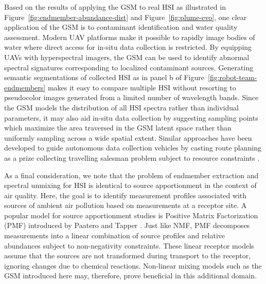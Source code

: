 Based on the results of applying the GSM to real HSI as illustrated in
Figure~\ref{fig:endmember-abundance-dist} and Figure~\ref{fig:plume-evo}, one
clear application of the GSM is to contaminant identification and water quality
assessment. Modern UAV platforms make it possible to rapidly image bodies of
water where direct access for in-situ data collection is restricted. By
equipping UAVs with hyperspectral imagers, the GSM can be used to identify
abnormal spectral signatures corresponding to localized contaminant sources.
Generating semantic segmentations of collected HSI as in panel b of
Figure~\ref{fig:robot-team-endmembers} makes it easy to compare multiple HSI
without resorting to pseudocolor images generated from a limited number of
wavelength bands. Since the GSM models the distribution of all HSI spectra
rather than individual parameters, it may also aid in-situ data collection by
suggesting sampling points which maximize the area traversed in the GSM latent
space rather than uniformly sampling across a wide spatial extent. Similar
approaches have been developed to guide autonomous data collection vehicles by
casting route planning as a prize collecting travelling salesman problem subject
to resource constraints \cite{balas2007prize, suryan2020learning}.


As a final consideration, we note that the problem of endmember extraction and
spectral unmixing for HSI is identical to source apportionment in the context of
air quality. Here, the goal is to identify measurement profiles associated with
sources of ambient air pollution based on measurements at a receptor site. A
popular model for source apportionment studies is Positive Matrix Factorization
(PMF) introduced by Paatero and Tapper \cite{pmf-orig,
  ulbrich2009interpretation}. Just like NMF, PMF decomposes measurements into a
linear combination of source profiles and relative abundances subject to
non-negativity constraints. These linear receptor models assume that the sources
are not transformed during transport to the receptor, ignoring changes due to
chemical reactions. Non-linear mixing models such as the GSM introduced here
may, therefore, prove beneficial in this additional domain.


